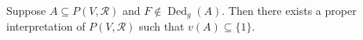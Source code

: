 Suppose $A \subseteq P(V, \mathcal{R})$ and $F \notin \operatorname{Ded}_g(A)$. Then there exists a proper interpretation of $P(V, \mathcal{R})$ such that $v(A) \subseteq \{1\}$.
